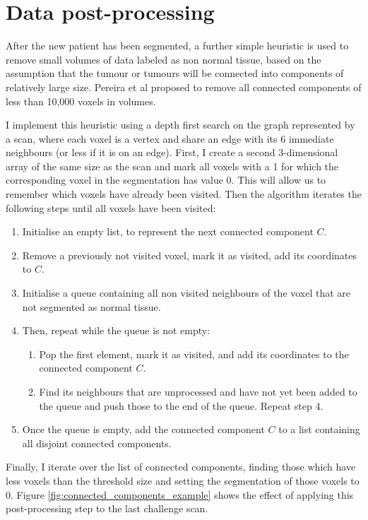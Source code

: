 \documentclass[12pt,a4paper,twoside,openright]{report}
\begin{document}
\section{Data post-processing}
After the new patient has been segmented, a further simple heuristic is used to remove small volumes of data labeled as non normal tissue, based on the assumption that the tumour or tumours will be connected into components of relatively large size. Pereira et al \cite{pereira} proposed to remove all connected components of less than 10,000 voxels in volumes.

I implement this heuristic using a depth first search on the graph represented by a scan, where each voxel is a vertex and share an edge with its 6 immediate neighbours (or less if it is on an edge). First, I create a second 3-dimensional array of the same size as the scan and mark all voxels with a 1 for which the corresponding voxel in the segmentation has value 0. This will allow us to remember which voxels have already been visited. Then the algorithm iterates the following steps until all voxels have been visited:
\begin{enumerate}
	\item Initialise an empty list, to represent the next connected component $C$.
	\item Remove a previously not visited voxel, mark it as visited, add its coordinates to $C$.
	\item Initialise a queue containing all non visited neighbours of the voxel that are not segmented as normal tissue.
	\item Then, repeat while the queue is not empty:
	\begin{enumerate}
		\item Pop the first element, mark it as visited, and add its coordinates to the connected component $C$.
		\item Find its neighbours that are unprocessed and have not yet been added to the queue and push those to the end of the queue. Repeat step 4.
	\end{enumerate}
	\item Once the queue is empty, add the connected component $C$ to a list containing all disjoint connected components.
\end{enumerate}
Finally, I iterate over the list of connected components, finding those which have less voxels than the threshold size and setting the segmentation of those voxels to 0. Figure \ref{fig:connected_components_example} shows the effect of applying this post-processing step to the last challenge scan.
\end{document}
